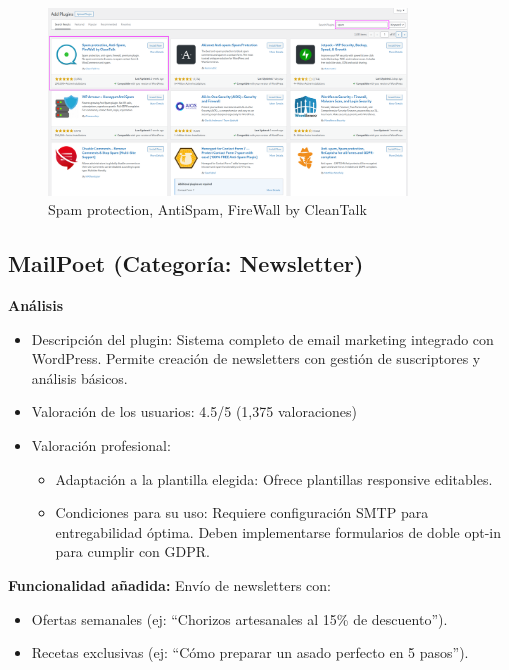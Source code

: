 \documentclass[a4paper]{article}
\begin{document}
\begin{figure}[H]
    \centering
    \includegraphics[width=0.85\textwidth]{images/popularidad-antispam.png}
    \caption{Spam protection, AntiSpam, FireWall by CleanTalk}
\end{figure}


\subsection{MailPoet (Categoría: Newsletter)}

\textbf{Análisis}
\begin{itemize}
    \item Descripción del plugin: Sistema completo de email marketing integrado con WordPress. Permite creación de newsletters con gestión de suscriptores y análisis básicos.
    \item Valoración de los usuarios: 4.5/5 (1,375 valoraciones)
    \item Valoración profesional:
    \begin{itemize}
        \item Adaptación a la plantilla elegida: Ofrece plantillas responsive editables.
        \item Condiciones para su uso: Requiere configuración SMTP para entregabilidad óptima. Deben implementarse formularios de doble opt-in para cumplir con GDPR.
    \end{itemize}
\end{itemize}

\textbf{Funcionalidad añadida:} Envío de newsletters con:
\begin{itemize}
    \item Ofertas semanales (ej: ``Chorizos artesanales al 15\% de descuento'').
    \item Recetas exclusivas (ej: ``Cómo preparar un asado perfecto en 5 pasos'').
\end{itemize}
\end{document}
